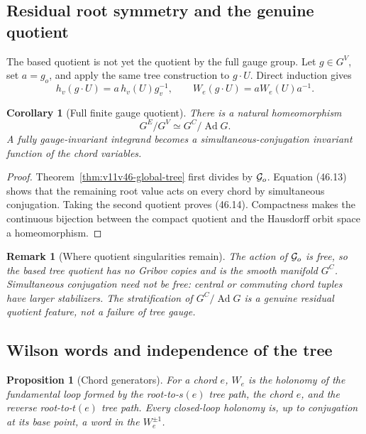 \documentclass[11pt]{article}
\newtheorem{proposition}[theorem]{Proposition}
\newtheorem{corollary}[theorem]{Corollary}
\newtheorem{remark}[theorem]{Remark}
\begin{document}
\subsection{Residual root symmetry and the genuine quotient}

The based quotient is not yet the quotient by the full gauge group.
Let \(g\in G^V\), set \(a=g_o\), and apply the same tree construction
to \(g\cdot U\).  Direct induction gives
\[
        h_v(g\cdot U)=a\,h_v(U)g_v^{-1},\qquad
        W_e(g\cdot U)=aW_e(U)a^{-1}.                           \tag{46.13}
\]

\begin{corollary}[Full finite gauge quotient]
\label{cor:v11v46-full-quotient}
There is a natural homeomorphism
\[
                   G^E/G^V\simeq G^C/\operatorname{Ad}G.      \tag{46.14}
\]
A fully gauge-invariant integrand becomes a simultaneous-conjugation
invariant function of the chord variables.
\end{corollary}

\begin{proof}
Theorem~\ref{thm:v11v46-global-tree} first divides by
\({\cal G}_o\).  Equation (46.13) shows that the remaining root value
acts on every chord by simultaneous conjugation.  Taking the second
quotient proves (46.14).  Compactness makes the continuous bijection
between the compact quotient and the Hausdorff orbit space a
homeomorphism.
\end{proof}

\begin{remark}[Where quotient singularities remain]
The action of \({\cal G}_o\) is free, so the based tree quotient has no
Gribov copies and is the smooth manifold \(G^C\).  Simultaneous
conjugation need not be free: central or commuting chord tuples have
larger stabilizers.  The stratification of
\(G^C/\operatorname{Ad}G\) is a genuine residual quotient feature, not
a failure of tree gauge.
\end{remark}

\subsection{Wilson words and independence of the tree}

\begin{proposition}[Chord generators]
\label{prop:v11v46-chord-generators}
For a chord \(e\), \(W_e\) is the holonomy of the fundamental loop
formed by the root-to-\(s(e)\) tree path, the chord \(e\), and the
reverse root-to-\(t(e)\) tree path.  Every closed-loop holonomy is,
up to conjugation at its base point, a word in the \(W_e^{\pm1}\).
\end{proposition}
\end{document}

